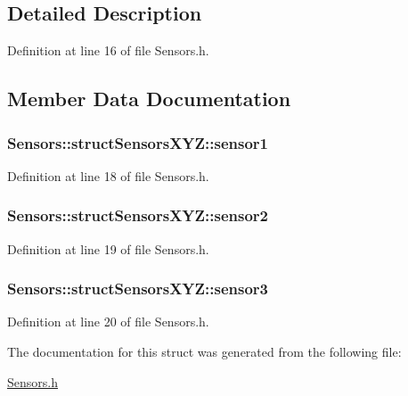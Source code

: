 \subsection{Detailed Description}


Definition at line 16 of file Sensors.\+h.



\subsection{Member Data Documentation}
\subsubsection[{\texorpdfstring{sensor1}{sensor1}}]{ Sensors\+::struct\+Sensors\+X\+Y\+Z\+::sensor1}\hypertarget{struct_sensors_1_1struct_sensors_x_y_z_a88c3affd022da7975c8011a3640ac655}{}\label{struct_sensors_1_1struct_sensors_x_y_z_a88c3affd022da7975c8011a3640ac655}


Definition at line 18 of file Sensors.\+h.

\subsubsection[{\texorpdfstring{sensor2}{sensor2}}]{ Sensors\+::struct\+Sensors\+X\+Y\+Z\+::sensor2}\hypertarget{struct_sensors_1_1struct_sensors_x_y_z_a79527c333b737562740be33cb0c03f30}{}\label{struct_sensors_1_1struct_sensors_x_y_z_a79527c333b737562740be33cb0c03f30}


Definition at line 19 of file Sensors.\+h.

\subsubsection[{\texorpdfstring{sensor3}{sensor3}}]{ Sensors\+::struct\+Sensors\+X\+Y\+Z\+::sensor3}\hypertarget{struct_sensors_1_1struct_sensors_x_y_z_a6b58731f4717dedef149f292c7098b8e}{}\label{struct_sensors_1_1struct_sensors_x_y_z_a6b58731f4717dedef149f292c7098b8e}


Definition at line 20 of file Sensors.\+h.



The documentation for this struct was generated from the following file\+:\begin{DoxyCompactItemize}
\item 
\hyperlink{_sensors_8h}{Sensors.\+h}\end{DoxyCompactItemize}
